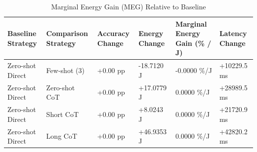 \begin{table}
\caption{Marginal Energy Gain (MEG) Relative to Baseline}
\label{tab:marginal_energy_gain}
\begin{tabular}{llllll}
\toprule
Baseline Strategy & Comparison Strategy & Accuracy Change & Energy Change & Marginal Energy Gain (\% / J) & Latency Change \\
\midrule
Zero-shot Direct & Few-shot (3) & +0.00 pp & -18.7120 J & -0.0000 \%/J & +10229.5 ms \\
Zero-shot Direct & Zero-shot CoT & +0.00 pp & +17.0779 J & 0.0000 \%/J & +28989.5 ms \\
Zero-shot Direct & Short CoT & +0.00 pp & +8.0243 J & 0.0000 \%/J & +21720.9 ms \\
Zero-shot Direct & Long CoT & +0.00 pp & +46.9353 J & 0.0000 \%/J & +42820.2 ms \\
\bottomrule
\end{tabular}
\end{table}
